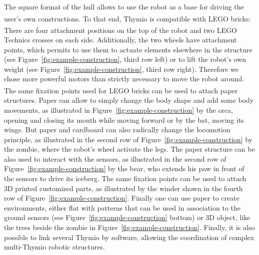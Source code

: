 \documentclass[letterpaper, 10 pt, conference]{ieeeconf}  %
\begin{document}
The square format of the hull allows to use the robot as a base for driving the user's own constructions.
To that end, Thymio is compatible with LEGO\textsuperscript{\textregistered} bricks:
There are four attachment positions on the top of the robot and two LEGO\textsuperscript{\textregistered} Technics crosses on each side.
Additionally, the two wheels have attachment points, which permits to use them to actuate elements elsewhere in the structure (see Figure~\ref{fig:example-construction}, third row left) or to lift the robot's own weight (see Figure~\ref{fig:example-construction}, third row right).
Therefore we chose more powerful motors than strictly necessary to move the robot around.
The same fixation points used for LEGO\textsuperscript{\textregistered} bricks can be used to attach paper structures.
Paper can allow to simply change the body shape and add some body movements, as illustrated in Figure~\ref{fig:example-construction} by the orca, opening and closing its mouth while moving forward or by the bat, moving its wings. 
But paper and cardboard can also radically change the locomotion principle, as illustrated in the second row of Figure~\ref{fig:example-construction} by the zombie, where the robot's wheel activate the legs. 
The paper structure can be also used to interact with the sensors, as illustrated in the second row of Figure~\ref{fig:example-construction} by the bear, who extends his paw in front of the sensors to drive its iceberg.
The same fixation points can be used to attach 3D printed customized parts, as illustrated by the winder shown in the fourth row of Figure~\ref{fig:example-construction}.
Finally one can use paper to create environments, either flat with patterns that can be used in association to the ground sensors (see Figure~\ref{fig:example-construction} bottom) or 3D object, like the trees beside the zombie in Figure~\ref{fig:example-construction}.
Finally, it is also possible to link several Thymio by software, allowing the coordination of complex multi-Thymio robotic structures.
\end{document}
